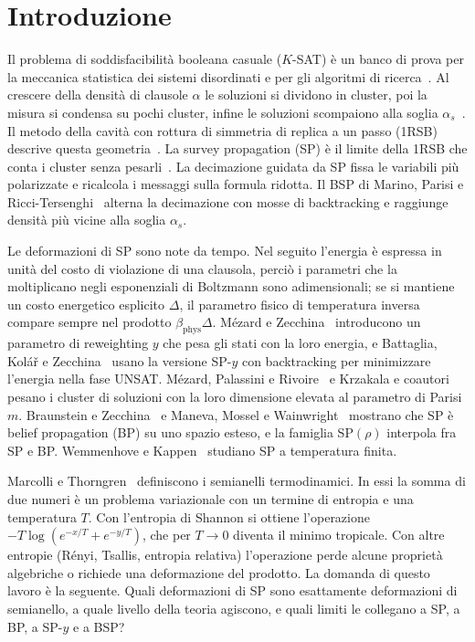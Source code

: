 \section{Introduzione}
\label{sec:intro}

Il problema di soddisfacibilità booleana casuale ($K$-SAT) è un banco di prova per la meccanica statistica dei sistemi disordinati e per gli algoritmi di ricerca~\citep{mezard2009information}.
Al crescere della densità di clausole $\alpha$ le soluzioni si dividono in cluster, poi la misura si condensa su pochi cluster, infine le soluzioni scompaiono alla soglia $\alpha_s$~\citep{mezard2002analytic,krzakala2007clusters,montanari2008clusters}.
Il metodo della cavità con rottura di simmetria di replica a un passo (1RSB) descrive questa geometria~\citep{mezard2001bethe,mezard2003cavity}.
La survey propagation (SP) è il limite della 1RSB che conta i cluster senza pesarli~\citep{mezard2002analytic,mezard2002random,braunstein2005survey}.
La decimazione guidata da SP fissa le variabili più polarizzate e ricalcola i messaggi sulla formula ridotta.
Il BSP di Marino, Parisi e Ricci-Tersenghi~\citep{marino2016bsp} alterna la decimazione con mosse di backtracking e raggiunge densità più vicine alla soglia $\alpha_s$.

Le deformazioni di SP sono note da tempo.
Nel seguito l'energia è espressa in unità del costo di violazione di una clausola, perciò i parametri che la moltiplicano negli esponenziali di Boltzmann sono adimensionali; se si mantiene un costo energetico esplicito $\Delta$, il parametro fisico di temperatura inversa compare sempre nel prodotto $\beta_{\mathrm{phys}}\Delta$.
Mézard e Zecchina~\citep{mezard2002random} introducono un parametro di reweighting $y$ che pesa gli stati con la loro energia, e Battaglia, Kolář e Zecchina~\citep{battaglia2004minimizing} usano la versione SP-$y$ con backtracking per minimizzare l'energia nella fase UNSAT.
Mézard, Palassini e Rivoire~\citep{mezard2005landscape} e Krzakala e coautori~\citep{krzakala2007clusters} pesano i cluster di soluzioni con la loro dimensione elevata al parametro di Parisi $m$.
Braunstein e Zecchina~\citep{braunstein2004surveybp} e Maneva, Mossel e Wainwright~\citep{maneva2007survey} mostrano che SP è belief propagation (BP) su uno spazio esteso, e la famiglia SP$(\rho)$ interpola fra SP e BP.
Wemmenhove e Kappen~\citep{wemmenhove2006finite} studiano SP a temperatura finita.

Marcolli e Thorngren~\citep{marcolli2014thermodynamic} definiscono i semianelli termodinamici.
In essi la somma di due numeri è un problema variazionale con un termine di entropia e una temperatura $T$.
Con l'entropia di Shannon si ottiene l'operazione $-T\log(e^{-x/T}+e^{-y/T})$, che per $T\to 0$ diventa il minimo tropicale.
Con altre entropie (Rényi, Tsallis, entropia relativa) l'operazione perde alcune proprietà algebriche o richiede una deformazione del prodotto.
La domanda di questo lavoro è la seguente.
Quali deformazioni di SP sono esattamente deformazioni di semianello, a quale livello della teoria agiscono, e quali limiti le collegano a SP, a BP, a SP-$y$ e a BSP?

